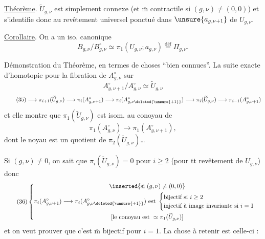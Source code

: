 \uline{Théorème}. $\widetilde U_{g,\nu}$ est simplement connexe  (et $\overline{\mathrm m}$ contractile si $(g,\nu)\ne(0,0)$) et s'identifie donc au revêtement universel ponctué dans $\unsure{a_{g,\nu+1}}$ de $U_{g,\nu}$.


\uline{Corollaire}. On a un iso. canonique
\[
\tag{34}
B_{g,\nu}/B_{g,\nu}^{\circ}\simeq\pi_1(U_{g,\nu};a_{g,\nu})\overset{\text{déf}}{=}\Pi_{g,\nu}.
\]

Démonstration du Théorème, en termes de choses ``bien connues''. La  suite exacte d'homotopie pour la fibration de $A_{g,\nu}^{\circ}$ sur
\[
A_{g,\nu+1}^{\circ}/A_{g,\nu}^{\circ}\simeq\widetilde U_{g,\nu}
\]
\[
\tag{35}
\longrightarrow\pi_{i+1}(\widetilde U_{g,\nu})
\longrightarrow\pi_i(A_{g,\nu+1}^{\circ})
\longrightarrow\pi_i(A_{g,\nu\deleted{\unsure{+1}}}^{\circ})
\longrightarrow\pi_i(\widetilde U_{g,\nu})
\longrightarrow\pi_{i-1}(A_{g,\nu+1}^{\circ})
\]
et elle montre que $\pi_1(\widetilde U_{g,\nu})$ est isom. au conoyau de
\[
\pi_1(A_{g,\nu}^{\circ})\longrightarrow\pi_1(A_{g,\nu+1}^{\circ}),
\]
dont le noyau est un quotient de $\pi_2(\widetilde U_{g,\nu})$\ldots

Si $(g,\nu)\ne0$, on sait que $\pi_i(\widetilde U_{g,\nu})=0$ pour $i\geq2$ (pour tt revêtement de $U_{g,\nu}$) donc
\[
\tag{36}
\left\{\begin{gathered}
\inserted{\text{si }(g,\nu)\ne(0,0)}\\
\pi_i(A_{g,\nu+1}^{\circ})\longrightarrow\pi_i(A_{g,\nu\deleted{\unsure{+1}}}^{\circ})
\text{ est }\begin{cases}
\text{bijectif si }i\geq2\\
\text{injectif à image invariante si }i=1
\end{cases}\\
\text{[le conoyau est }\simeq\pi_1(\widetilde U_{g,\nu})\text{]}
\end{gathered}\right.
\]
et on veut prouver que c'est $\overline{\mathrm m}$ bijectif pour $i=1$. La chose à retenir  est celle-ci :

